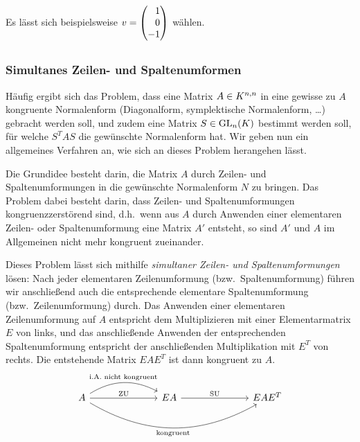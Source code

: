 \section{}





\subsection{}

Es lässt sich beispielsweise $v = \columnrvector{1 \\ 0 \\ -1}$ wählen.





\addtocounter{subsection}{1}
\subsection{}



\subsubsection*{Simultanes Zeilen- und Spaltenumformen}
Häufig ergibt sich das Problem, dass eine Matrix $A \in \matrices{n}{K}$ in eine gewisse zu $A$ kongruente Normalenform (Diagonalform, symplektische Normalenform, \dots) gebracht werden soll, und zudem eine Matrix $S \in \GL{n}{K}$ bestimmt werden soll, für welche $S^T A S$ die gewünschte Normalenform hat.
Wir geben nun ein allgemeines Verfahren an, wie sich an dieses Problem herangehen lässt.

Die Grundidee besteht darin, die Matrix $A$ durch Zeilen- und Spaltenumformungen in die gewünschte Normalenform $N$ zu bringen.
Das Problem dabei besteht darin, dass Zeilen- und Spaltenumformungen kongruenzzerstörend sind, d.h.\ wenn aus $A$ durch Anwenden einer elementaren Zeilen- oder Spaltenumformung eine Matrix $A'$ entsteht, so sind $A'$ und $A$ im Allgemeinen nicht mehr kongruent zueinander.

Dieses Problem lässt sich mithilfe \emph{simultaner Zeilen- und Spaltenumformungen} lösen:
Nach jeder elementaren Zeilenumformung (bzw.\ Spaltenumformung) führen wir anschließend auch die entsprechende elementare Spaltenumformung (bzw.\ Zeilenumformung) durch.
Das Anwenden einer elementaren Zeilenumformung auf $A$ entspricht dem Multiplizieren mit einer Elementarmatrix $E$ von links, und das anschließende Anwenden der entsprechenden Spaltenumformung entspricht der anschließenden Multiplikation mit $E^T$ von rechts.
Die entstehende Matrix $E A E^T$ ist dann kongruent zu $A$.
\[
  \begin{tikzcd}[column sep = 7em]
      A
      \arrow{r}[above]{\text{ZU}}
      \arrow[bend left]{r}[above]{\text{i.A.\ nicht kongruent}}
      \arrow[bend right]{rr}[below]{\text{kongruent}}
    & EA
      \arrow{r}[above]{\text{SU}}
    & EAE^T
  \end{tikzcd}
\]

